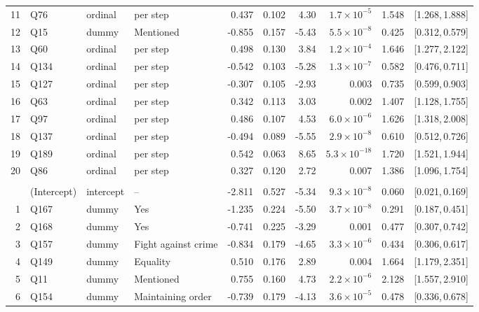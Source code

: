 \begin{landscape}
\begin{longtable}{r l l l r r r r r c}
11 & Q76 & ordinal & per step & 0.437 & 0.102 & 4.30 & $1.7{\times}10^{-5}$ & 1.548 & [1.268,\,1.888] &  \\
12 & Q15 & dummy & Mentioned & -0.855 & 0.157 & -5.43 & $5.5{\times}10^{-8}$ & 0.425 & [0.312,\,0.579] &  \\
13 & Q60 & ordinal & per step & 0.498 & 0.130 & 3.84 & $1.2{\times}10^{-4}$ & 1.646 & [1.277,\,2.122] &  \\
14 & Q134 & ordinal & per step & -0.542 & 0.103 & -5.28 & $1.3{\times}10^{-7}$ & 0.582 & [0.476,\,0.711] &  \\
15 & Q127 & ordinal & per step & -0.307 & 0.105 & -2.93 & 0.003 & 0.735 & [0.599,\,0.903] &  \\
16 & Q63 & ordinal & per step & 0.342 & 0.113 & 3.03 & 0.002 & 1.407 & [1.128,\,1.755] &  \\
17 & Q97 & ordinal & per step & 0.486 & 0.107 & 4.53 & $6.0{\times}10^{-6}$ & 1.626 & [1.318,\,2.008] &  \\
18 & Q137 & ordinal & per step & -0.494 & 0.089 & -5.55 & $2.9{\times}10^{-8}$ & 0.610 & [0.512,\,0.726] &  \\
19 & Q189 & ordinal & per step & 0.542 & 0.063 & 8.65 & $5.3{\times}10^{-18}$ & 1.720 & [1.521,\,1.944] &  \\
20 & Q86 & ordinal & per step & 0.327 & 0.120 & 2.72 & 0.007 & 1.386 & [1.096,\,1.754] &  \\
\addlinespace[4pt]
\multicolumn{9}{l}{\textbf{Cluster 2} \quad \small $n = 2579$ ($n_{\text{in}} = 945$), AIC $= 1214.0$, residual deviance $= 1172.0$ on 2558 df}\\[2pt]
 & (Intercept) & intercept & -- & -2.811 & 0.527 & -5.34 & $9.3{\times}10^{-8}$ & 0.060 & [0.021,\,0.169] &  \\
1 & Q167 & dummy & Yes & -1.235 & 0.224 & -5.50 & $3.7{\times}10^{-8}$ & 0.291 & [0.187,\,0.451] &  \\
2 & Q168 & dummy & Yes & -0.741 & 0.225 & -3.29 & 0.001 & 0.477 & [0.307,\,0.742] &  \\
3 & Q157 & dummy & Fight against crime & -0.834 & 0.179 & -4.65 & $3.3{\times}10^{-6}$ & 0.434 & [0.306,\,0.617] &  \\
4 & Q149 & dummy & Equality & 0.510 & 0.176 & 2.89 & 0.004 & 1.664 & [1.179,\,2.351] &  \\
5 & Q11 & dummy & Mentioned & 0.755 & 0.160 & 4.73 & $2.2{\times}10^{-6}$ & 2.128 & [1.557,\,2.910] &  \\
6 & Q154 & dummy & Maintaining order & -0.739 & 0.179 & -4.13 & $3.6{\times}10^{-5}$ & 0.478 & [0.336,\,0.678] &  \\

\end{longtable}
\end{landscape}
